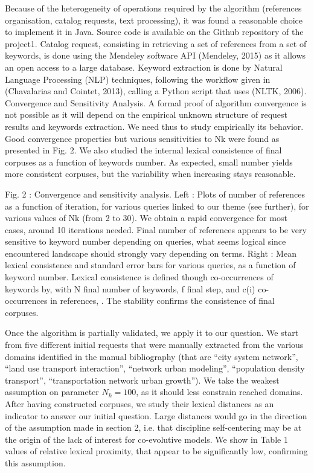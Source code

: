 Because of the heterogeneity of operations required by the algorithm (references organisation, catalog requests, text processing), it was found a reasonable choice to implement it in Java. Source code is available on the Github repository of the project1. Catalog request, consisting in retrieving a set of references from a set of keywords, is done using the Mendeley software API (Mendeley, 2015) as it allows an open access to a large database. Keyword extraction is done by Natural Language Processing (NLP) techniques, following the workflow given in (Chavalarias and Cointet, 2013), calling a Python script that uses (NLTK, 2006).
Convergence and Sensitivity Analysis. A formal proof of algorithm convergence is not possible as it will depend on the empirical unknown structure of request results and keywords extraction. We need thus to study empirically its behavior. Good convergence properties but various sensitivities to Nk were found as presented in Fig. 2. We also studied the internal lexical consistence of final corpuses as a function of keywords number. As expected, small number yields more consistent corpuses, but the variability when increasing stays reasonable.




Fig. 2 : Convergence and sensitivity analysis. Left : Plots of number of references as a function of iteration, for various queries linked to our theme (see further), for various values of Nk (from 2 to 30). We obtain a rapid convergence for most cases, around 10 iterations needed. Final number of references appears to be very sensitive to keyword number depending on queries, what seems logical since encountered landscape should strongly vary depending on terms. Right : Mean lexical consistence and standard error bars for various queries, as a function of keyword number. Lexical consistence is defined though co-occurrences of keywords by, with N final number of keywords, f final step, and c(i) co-occurrences in references, . The stability confirms the consistence of final corpuses.



Once the algorithm is partially validated, we apply it to our question. We start from five different initial requests that were manually extracted from the various domains identified in the manual bibliography (that are ``city system network'', ``land use transport interaction'', ``network urban modeling'', ``population density transport'', ``transportation network urban growth''). We take the weakest assumption on parameter $N_k=100$, as it should less  constrain reached domains. After having constructed corpuses, we study their lexical distances as an indicator to answer our initial question. Large distances would go in the direction of the assumption made in section 2, i.e. that discipline self-centering may be at the origin of the lack of interest for co-evolutive models. We show in Table 1 values of relative lexical proximity, that appear to be significantly low, confirming this assumption.

